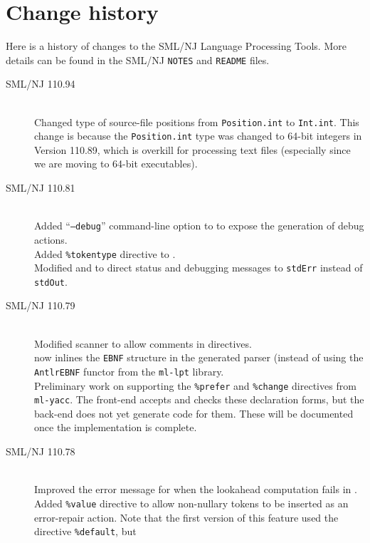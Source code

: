 %
\chapter{Change history}
\label{ch:history}

Here is a history of changes to the SML/NJ Language Processing Tools.
More details can be found in the SML/NJ \texttt{NOTES} and \texttt{README} files.
\begin{description}
  \item[SML/NJ 110.94]
    \mbox{}\\[0.5em]
    Changed type of source-file positions from \texttt{Position.int} to \texttt{Int.int}.
    This change is because the \texttt{Position.int} type was changed to 64-bit integers
    in Version 110.89, which is overkill for processing text files (especially since
    we are moving to 64-bit executables).
  \item[SML/NJ 110.81]
    \mbox{}\\[0.5em]
    Added ``\texttt{--debug}'' command-line option to \mlantlr{} to expose the generation
    of debug actions.
    \\[0.5em]
    Added \texttt{\%tokentype} directive to \mlantlr{}.
    \\[0.5em]
    Modified \mlantlr{} and \ulex{} to direct status and debugging messages to
    \texttt{stdErr} instead of \texttt{stdOut}.
%
 \item[SML/NJ 110.79]
    \mbox{}\\[0.5em]
    Modified scanner to allow comments in \ulex{} directives.
    \\[0.5em]
    \mlantlr{} now inlines the \texttt{EBNF} structure in the generated parser (instead of using
    the \texttt{AntlrEBNF} functor from the \texttt{ml-lpt} library.
    \\[0.5em]
    Preliminary work on supporting the \texttt{\%prefer} and \texttt{\%change} directives
    from \texttt{ml-yacc}.  The front-end accepts and checks these declaration forms, but
    the back-end does not yet generate code for them.  These will be documented once the
    implementation is complete.
%
  \item[SML/NJ 110.78]
    \mbox{}\\[0.5em]
    Improved the error message for when the lookahead computation fails in \mlantlr{}.
    \\[0.5em]
    Added \texttt{\%value} directive to allow non-nullary tokens to be inserted as
    an error-repair action.
    Note that the first version of this feature used the directive \texttt{\%default}, but

\end{description}
